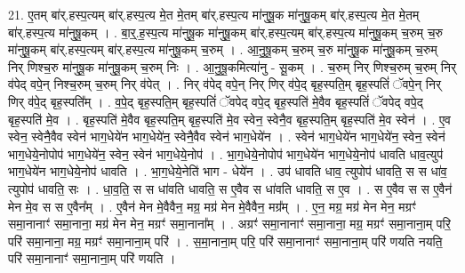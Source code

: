 \documentclass[17pt]{extarticle}
\begin{document}
21. ए॒तम् बा॑र्.हस्प॒त्यम् बा॑र्.हस्प॒त्य मे॒त मे॒तम् बा॑र्.हस्प॒त्य मा॑नुषू॒क मा॑नुषू॒कम् बा॑र्.हस्प॒त्य मे॒त मे॒तम् बा॑र्.हस्प॒त्य मा॑नुषू॒कम् । . बा॒र्॒.ह॒स्प॒त्य मा॑नुषू॒क मा॑नुषू॒कम् बा॑र्.हस्प॒त्यम् बा॑र्.हस्प॒त्य मा॑नुषू॒कम् च॒रुम् च॒रु मा॑नुषू॒कम् बा॑र्.हस्प॒त्यम् बा॑र्.हस्प॒त्य मा॑नुषू॒कम् च॒रुम् । . आ॒नु॒षू॒कम् च॒रुम् च॒रु मा॑नुषू॒क मा॑नुषू॒कम् च॒रुम् निर् णिश्च॒रु मा॑नुषू॒क मा॑नुषू॒कम् च॒रुम् निः । . आ॒नु॒षू॒कमित्या॑नु - सू॒कम् । . च॒रुम् निर् णिश्च॒रुम् च॒रुम् निर् व॑पेद् वपे॒न् निश्च॒रुम् च॒रुम् निर् व॑पेत् । . निर् व॑पेद् वपे॒न् निर् णिर् व॑पे॒द् बृह॒स्पति॒म् बृह॒स्पतिं॑ ॅवपे॒न् निर् णिर् व॑पे॒द् बृह॒स्पति᳚म् । . व॒पे॒द् बृह॒स्पति॒म् बृह॒स्पतिं॑ ॅवपेद् वपे॒द् बृह॒स्पति॑ मे॒वैव बृह॒स्पतिं॑ ॅवपेद् वपे॒द् बृह॒स्पति॑ मे॒व । . बृह॒स्पति॑ मे॒वैव बृह॒स्पति॒म् बृह॒स्पति॑ मे॒व स्वेन॒ स्वेनै॒व बृह॒स्पति॒म् बृह॒स्पति॑ मे॒व स्वेन॑ । . ए॒व स्वेन॒ स्वेनै॒वैव स्वेन॑ भाग॒धेये॑न भाग॒धेये॑न॒ स्वेनै॒वैव स्वेन॑ भाग॒धेये॑न । . स्वेन॑ भाग॒धेये॑न भाग॒धेये॑न॒ स्वेन॒ स्वेन॑ भाग॒धेये॒नोपोप॑ भाग॒धेये॑न॒ स्वेन॒ स्वेन॑ भाग॒धेये॒नोप॑ । . भा॒ग॒धेये॒नोपोप॑ भाग॒धेये॑न भाग॒धेये॒नोप॑ धावति धाव॒त्युप॑ भाग॒धेये॑न भाग॒धेये॒नोप॑ धावति । . भा॒ग॒धेये॒नेति॑ भाग - धेये॑न । . उप॑ धावति धाव॒ त्युपोप॑ धावति॒ स स धा॑व॒ त्युपोप॑ धावति॒ सः । . धा॒व॒ति॒ स स धा॑वति धावति॒ स ए॒वैव स धा॑वति धावति॒ स ए॒व । . स ए॒वैव स स ए॒वैन॑ मेन मे॒व स स ए॒वैन᳚म् । . ए॒वैन॑ मेन मे॒वैवैन॒ मग्र॒ मग्र॑ मेन मे॒वैवैन॒ मग्र᳚म् । . ए॒न॒ मग्र॒ मग्र॑ मेन मेन॒ मग्रꣳ॑ समा॒नानाꣳ॑ समा॒नाना॒ मग्र॑ मेन मेन॒ मग्रꣳ॑ समा॒नाना᳚म् । . अग्रꣳ॑ समा॒नानाꣳ॑ समा॒नाना॒ मग्र॒ मग्रꣳ॑ समा॒नाना॒म् परि॒ परि॑ समा॒नाना॒ मग्र॒ मग्रꣳ॑ समा॒नाना॒म् परि॑ । . स॒मा॒नाना॒म् परि॒ परि॑ समा॒नानाꣳ॑ समा॒नाना॒म् परि॑ णयति नयति॒ परि॑ समा॒नानाꣳ॑ समा॒नाना॒म् परि॑ णयति । \newline
\end{document}
